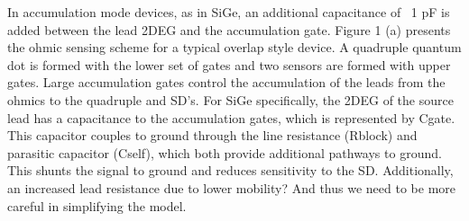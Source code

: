 \documentclass{article}
\begin{document}
	\color{blue}In accumulation mode devices, as in SiGe, \color{black} an additional capacitance of ~1 pF is added between the lead 2DEG and the accumulation gate.  Figure 1 (a) presents the ohmic sensing scheme for a typical overlap style device.  A quadruple quantum dot is formed with the lower set of gates and two sensors are formed with upper gates.  Large accumulation gates control the accumulation of the leads from the ohmics to the quadruple and SD’s.  For SiGe specifically, the 2DEG of the source lead has a capacitance to the accumulation gates, which is represented by Cgate. This capacitor couples to ground through the line resistance
	(Rblock) and parasitic capacitor (Cself), which both provide additional pathways to ground. This shunts the signal to ground and reduces sensitivity to the SD. \color{blue} Additionally, an increased lead resistance due to lower mobility? And thus we need to be more careful in simplifying the model. \color{black}

\end{document}
